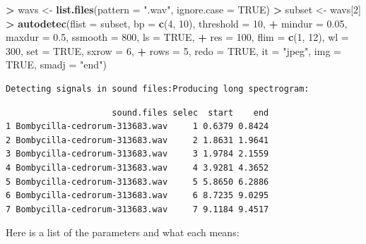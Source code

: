 \documentclass[]{krantz}
\makeatletter
\newenvironment{Shaded}{\begin{snugshade}}{\end{snugshade}}
\newcommand{\DataTypeTok}[1]{\textcolor[rgb]{0.27,0.27,0.27}{#1}}
\newcommand{\DecValTok}[1]{\textcolor[rgb]{0.06,0.06,0.06}{#1}}
\newcommand{\FloatTok}[1]{\textcolor[rgb]{0.06,0.06,0.06}{#1}}
\newcommand{\KeywordTok}[1]{\textcolor[rgb]{0.27,0.27,0.27}{\textbf{#1}}}
\newcommand{\NormalTok}[1]{#1}
\newcommand{\OperatorTok}[1]{\textcolor[rgb]{0.43,0.43,0.43}{\textbf{#1}}}
\newcommand{\OtherTok}[1]{\textcolor[rgb]{0.37,0.37,0.37}{#1}}
\newcommand{\StringTok}[1]{\textcolor[rgb]{0.5,0.5,0.5}{#1}}
\newenvironment{kframe}{%
\medskip{}
\setlength{\fboxsep}{.8em}
 \def\at@end@of@kframe{}%
 \ifinner\ifhmode%
  \def\at@end@of@kframe{\end{minipage}}%
  \begin{minipage}{\columnwidth}%
 \fi\fi%
 \def\FrameCommand##1{\hskip\@totalleftmargin \hskip-\fboxsep
 \colorbox{shadecolor}{##1}\hskip-\fboxsep
     \hskip-\linewidth \hskip-\@totalleftmargin \hskip\columnwidth}%
 \MakeFramed {\advance\hsize-\width
   \@totalleftmargin\z@ \linewidth\hsize
   \@setminipage}}%
 {\par\unskip\endMakeFramed%
 \at@end@of@kframe}
\renewenvironment{Shaded}{\begin{kframe}}{\end{kframe}}
\makeatother
\begin{document}
\begin{Shaded}
\begin{Highlighting}[]
\OperatorTok{>}\StringTok{ }\NormalTok{wavs <-}\StringTok{ }\KeywordTok{list.files}\NormalTok{(}\DataTypeTok{pattern =} \StringTok{".wav"}\NormalTok{, }\DataTypeTok{ignore.case =} \OtherTok{TRUE}\NormalTok{)}
\OperatorTok{>}\StringTok{ }\NormalTok{subset <-}\StringTok{ }\NormalTok{wavs[}\DecValTok{2}\NormalTok{]}
\OperatorTok{>}\StringTok{ }\KeywordTok{autodetec}\NormalTok{(}\DataTypeTok{flist =}\NormalTok{ subset, }\DataTypeTok{bp =} \KeywordTok{c}\NormalTok{(}\DecValTok{4}\NormalTok{, }\DecValTok{10}\NormalTok{), }\DataTypeTok{threshold =} \DecValTok{10}\NormalTok{, }
\OperatorTok{+}\StringTok{   }\DataTypeTok{mindur =} \FloatTok{0.05}\NormalTok{, }\DataTypeTok{maxdur =} \FloatTok{0.5}\NormalTok{, }\DataTypeTok{ssmooth =} \DecValTok{800}\NormalTok{, }\DataTypeTok{ls =} \OtherTok{TRUE}\NormalTok{, }
\OperatorTok{+}\StringTok{   }\DataTypeTok{res =} \DecValTok{100}\NormalTok{, }\DataTypeTok{flim =} \KeywordTok{c}\NormalTok{(}\DecValTok{1}\NormalTok{, }\DecValTok{12}\NormalTok{), }\DataTypeTok{wl =} \DecValTok{300}\NormalTok{, }\DataTypeTok{set =} \OtherTok{TRUE}\NormalTok{, }\DataTypeTok{sxrow =} \DecValTok{6}\NormalTok{, }
\OperatorTok{+}\StringTok{   }\DataTypeTok{rows =} \DecValTok{5}\NormalTok{, }\DataTypeTok{redo =} \OtherTok{TRUE}\NormalTok{, }\DataTypeTok{it =} \StringTok{"jpeg"}\NormalTok{, }\DataTypeTok{img =} \OtherTok{TRUE}\NormalTok{, }\DataTypeTok{smadj =} \StringTok{"end"}\NormalTok{)}
\end{Highlighting}
\end{Shaded}

\begin{verbatim}
Detecting signals in sound files:Producing long spectrogram:
\end{verbatim}

\begin{verbatim}
                     sound.files selec  start    end
1 Bombycilla-cedrorum-313683.wav     1 0.6379 0.8424
2 Bombycilla-cedrorum-313683.wav     2 1.8631 1.9641
3 Bombycilla-cedrorum-313683.wav     3 1.9784 2.1559
4 Bombycilla-cedrorum-313683.wav     4 3.9281 4.3652
5 Bombycilla-cedrorum-313683.wav     5 5.8650 6.2886
6 Bombycilla-cedrorum-313683.wav     6 8.7235 9.0295
7 Bombycilla-cedrorum-313683.wav     7 9.1184 9.4517
\end{verbatim}

Here is a list of the parameters and what each means:
\end{document}
